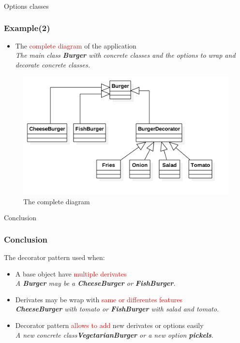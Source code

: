 \documentclass{beamer}
\begin{document}
  \begin{frame}{Options classes}
    \frametitle{Example(2)}
    \begin{itemize}
      \item The \textcolor{red}{complete diagram} of the application\\
      \textit{The main class \textbf{Burger} with concrete classes and the options to wrap and decorate concrete classes.}
    \end{itemize}
    \begin{figure}[!b]
      \centering
      \includegraphics[scale=0.4]{Burger}
      \caption{The complete diagram}
    \end{figure}
  \end{frame}

  \begin{frame}{Conclusion}
    \frametitle{Conclusion}
    The decorator pattern used when:
    \begin{itemize}
      \item A base object have \textcolor{red}{multiple derivates} \\
      \textit{A \textbf{Burger} may be a \textbf{CheeseBurger} or \textbf{FishBurger}.}
      \item Derivates may be wrap with \textcolor{red}{same or differentes features} \\
      \textit{\textbf{CheeseBurger} with tomato or \textbf{FishBurger} with salad and tomato.}
      \item Decorator pattern \textcolor{red}{allows to add} new derivates or options easily \\
      \textit{A new concrete class\textbf{VegetarianBurger} or a new option \textbf{pickels}.}
    \end{itemize}
  \end{frame}
\end{document}
